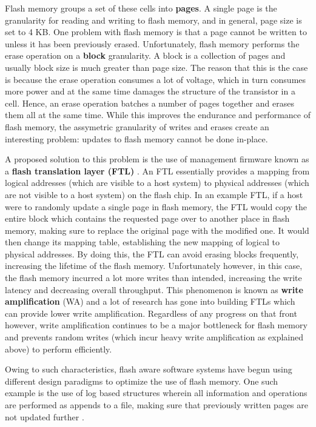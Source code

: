 \documentclass[10pt, author, twocolumn]{article}
\begin{document}
Flash memory groups a set of these cells into \textbf{pages}. A single page is the granularity for reading and writing to flash memory, and in general, page size is set to 4 KB. One problem with flash memory is that a page cannot be written to unless it has been previously erased. Unfortunately, flash memory performs the erase operation on a \textbf{block} granularity. A block is a collection of pages and usually block size is much greater than page size. The reason that this is the case is because the erase operation consumes a lot of voltage, which in turn consumes more power and at the same time damages the structure of the transistor in a cell. Hence, an erase operation batches a number of pages together and erases them all at the same time. While this improves the endurance and performance of flash memory, the assymetric granularity of writes and erases create an interesting problem: updates to flash memory cannot be done in-place.

A proposed solution to this problem is the use of management firmware known as a \textbf{flash translation layer (FTL)} \cite{}. An FTL essentially provides a mapping from logical addresses (which are visible to a host system) to physical addresses (which are not visible to a host system) on the flash chip. In an example FTL, if a host were to randomly update a single page in flash memory, the FTL would copy the entire block which contains the requested page over to another place in flash memory, making sure to replace the original page with the modified one. It would then change its mapping table, establishing the new mapping of logical to physical addresses. By doing this, the FTL can avoid erasing blocks frequently, increasing the lifetime of the flash memory. Unfortunately however, in this case, the flash memory incurred a lot more writes than intended, increasing the write latency and decreasing overall throughput. This phenomenon is known as \textbf{write amplification} (WA) and a lot of research has gone into building FTLs which can provide lower write amplification. Regardless of any progress on that front however, write amplification continues to be a major bottleneck for flash memory and prevents random writes (which incur heavy write amplification as explained above) to perform efficiently.

Owing to such characteristics, flash aware software systems have begun using different design paradigms to optimize the use of flash memory. One such example is the use of log based structures wherein all information and operations are performed as appends to a file, making sure that previously written pages are not updated further \cite{}. 
\end{document}
